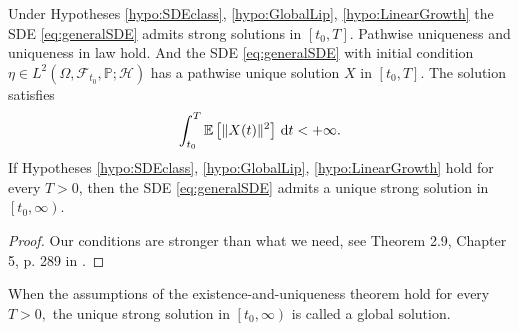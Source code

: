 \begin{theorem}\label{thm:Main_theorem_solution}
	Under Hypotheses \ref{hypo:SDEclass}, \ref{hypo:GlobalLip},  \ref{hypo:LinearGrowth} the SDE \eqref{eq:generalSDE} admits strong solutions in $ \left[  t_0, T\right] $. Pathwise uniqueness and uniqueness in law hold. And the SDE \eqref{eq:generalSDE} with initial condition $\eta \in L^{2}\left(\Omega, \mathcal{F}_{t_{0}}, \mathbb{P} ; \mathcal{H}\right)$ has a pathwise unique solution $X$ in $\left[t_{0}, T\right]$. The solution satisfies
	\[ \int_{t_{0}}^{T} \mathbb{E}\left[\|X(t)\|^{2}\right] \,\mathrm{d} t<+\infty .\]
	If Hypotheses \ref{hypo:SDEclass},  \ref{hypo:GlobalLip}, \ref{hypo:LinearGrowth} hold for every $T>0$, then the SDE \eqref{eq:generalSDE} admits a unique strong solution in  $\left[ t_{0}, \infty\right) $.
\end{theorem}
\begin{proof}
	Our conditions are stronger than what we need, see Theorem 2.9, Chapter 5, p. 289 in \cite{KaratzasIoannisBmas}.
\end{proof}
When the assumptions of the existence-and-uniqueness theorem hold for every $T>0,$ the unique strong solution in $\left[t_{0}, \infty\right)$ is called a global solution.

